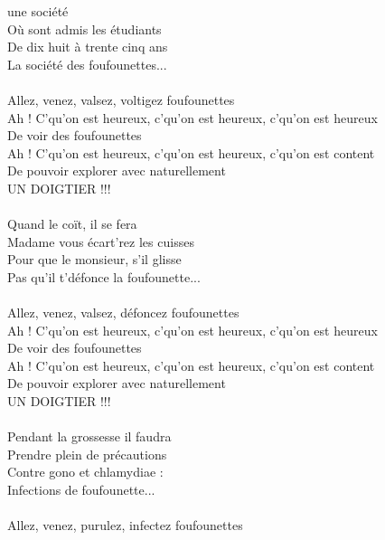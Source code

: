 
 une société ~~~~~~~~~~~~ \bissimple
\\Où sont admis les étudiants
\\De dix huit à trente cinq ans ~~~~\bissimple
\\La société des foufounettes...
\\\\Allez, venez, valsez, voltigez foufounettes
\\Ah ! C'qu'on est heureux, c'qu'on est heureux, c'qu'on est heureux
\\De voir des foufounettes
\\Ah ! C'qu'on est heureux, c'qu'on est heureux, c'qu'on est content
\\De pouvoir explorer avec naturellement
\\UN DOIGTIER !!!
\\\\Quand le coït, il se fera ~~~~~~~~~~~~~~~~\bissimple
\\Madame vous écart'rez les cuisses
\\Pour que le monsieur, s'il glisse ~~~~~~~~\bissimple
\\Pas qu'il t'défonce la foufounette...
\\\\Allez, venez, valsez, défoncez foufounettes
\\Ah ! C'qu'on est heureux, c'qu'on est heureux, c'qu'on est heureux
\\De voir des foufounettes
\\Ah ! C'qu'on est heureux, c'qu'on est heureux, c'qu'on est content
\\De pouvoir explorer avec naturellement
\\UN DOIGTIER !!!
\\\\Pendant la grossesse il faudra ~~~\bissimple
\\Prendre plein de précautions
\\Contre gono et chlamydiae :~~~~~~~~ \bissimple
\\Infections de foufounette...
\\\\Allez, venez, purulez, infectez foufounettes
